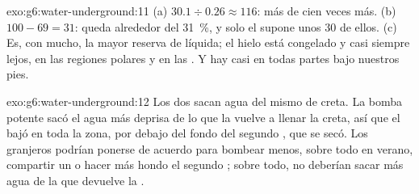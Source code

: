 \begin{solution}{exo:g6:water-underground:11}
(a) $30.1 \div 0.26 \approx 116$: más de cien veces más. (b)
$100 - 69 = 31$: queda alrededor del 31~\%, y solo el 
supone unos 30 de ellos. (c) Es, con mucho, la mayor reserva de 
líquida; el hielo está congelado y casi siempre lejos, en las regiones
polares y en las . Y hay  casi en todas partes bajo
nuestros pies.
\end{solution}

\begin{solution}{exo:g6:water-underground:12}
Los dos  sacan agua del mismo  de creta. La bomba potente sacó
el agua más deprisa de lo que la  vuelve a llenar la creta, así que
el  bajó en toda la zona, por debajo del fondo del segundo
, que se secó. Los granjeros podrían ponerse de acuerdo para bombear
menos, sobre todo en verano, compartir un  o hacer más hondo el segundo
; sobre todo, no deberían sacar más agua de la que devuelve la .
\end{solution}

